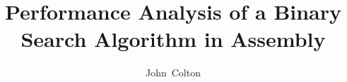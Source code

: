 \documentclass[journal]{IEEEtran}
\begin{document}
%
\title{Performance Analysis of a Binary Search Algorithm in Assembly}
%
%
%

\author{John~Colton\\ }

% 
%



% 
\end{document}
